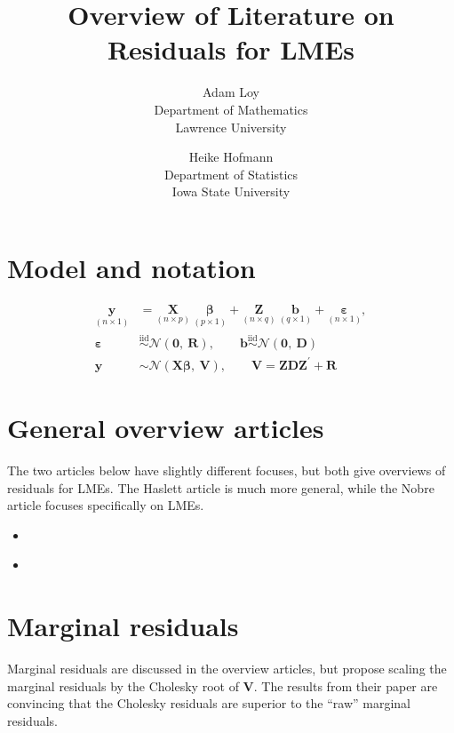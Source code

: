 \documentclass[11pt]{article} %
\begin{document}
\title{Overview of Literature on Residuals for LMEs}
\author{
	Adam Loy\\
	Department of Mathematics\\
	Lawrence University
\and
	Heike Hofmann\\
	Department of Statistics\\
	Iowa State University
}
\date{}
\maketitle

\section{Model and notation}

\begin{align}\label{eq:lmd}
	\underset{(n \times 1)}{\bm{y}} &= \underset{(n \times p)}{\bm{X}} \ \underset{(p \times 1)}{\bm{\beta}} + \underset{(n \times q)}{\bm{Z}} \ \underset{(q \times 1)}{\bm{b}} + \underset{(n \times 1)}{\bm{\varepsilon}},\\
	\bm{\varepsilon} & \overset{\text{iid}}{\sim} \mathcal{N}(\bm{0}, \ \bm{R}), \qquad \bm{b} \overset{\text{iid}}{\sim} \mathcal{N}(\bm{0},\ \bm{D}) \nonumber \\
	\bm{y} & \sim \mathcal{N}(\bm{X\beta},\ \bm{V}), \qquad \bm{V} = \bm{ZDZ}^\prime + \bm{R}
\end{align}

\section{General overview articles}

The two articles below have slightly different focuses, but both give overviews of residuals for LMEs. The Haslett article is much more general, while the Nobre article focuses specifically on LMEs.

\begin{itemize}
\item \cite{Haslett:2007vv}
\item \cite{Nobre:2007ej}
\end{itemize}


\section{Marginal residuals}

Marginal residuals are discussed in the overview articles, but  \cite{Houseman:2004gq} propose scaling the marginal residuals by the Cholesky root of $\bm{V}$. The results from their paper are convincing that the Cholesky residuals are superior to the ``raw'' marginal residuals.
\end{document}
